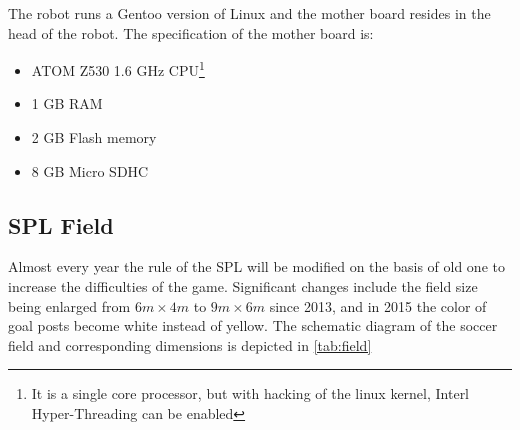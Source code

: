 The robot runs a Gentoo version of Linux and the mother board resides in the head of the robot. The specification of the mother board is:
\begin{itemize}
  \item ATOM Z530 1.6 GHz CPU\footnote{It is a single core processor, but with hacking of the linux kernel, Interl{\textregistered} Hyper-Threading can be enabled}
  \item 1 GB RAM
  \item 2 GB Flash memory
\item 8 GB Micro SDHC
\end{itemize}

\subsection{\gls{SPL} Field}
Almost every year the rule of the \gls{SPL} will be modified on the basis of old one to increase the difficulties of the game. Significant changes include the field size being enlarged from $6m \times 4m$ to $9m \times 6m$ since 2013, and in 2015 the color of goal posts become white instead of yellow. The schematic diagram of the soccer field and corresponding dimensions is depicted in \autoref{tab:field}

